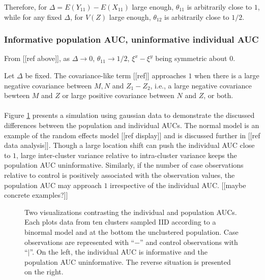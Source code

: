 \message{ !name(manuscript.tex)}\documentclass[12pt]{article}
\DeclareMathOperator{\AUC}{AUC}
\DeclareMathOperator{\V}{Var}
\newcommand{\E}{E}
\newcommand{\cind}{\perp \!\!\! \perp}
\newcommand{\aucindiv}{\theta_{11}}%
\newcommand{\aucpop}{\theta_{12}}%
\renewcommand{\V}{V}
\begin{document}
Therefore, for $\Delta=\E(Y_{11})-\E(X_{11})$ large enough, $\aucindiv$ is arbitrarily close to $1$, while for any fixed $\Delta$, for $\V(Z)$ large enough, $\aucpop$ is arbitrarily close to $1/2$.

\subsubsection{Informative population AUC, uninformative individual AUC}

From [[ref above]], as $\Delta\to 0$, $\aucindiv\to 1/2$,
$\xi^x-\xi^y$ being symmetric about $0$.

Let $\Delta$ be fixed. The covariance-like term [[ref]] approaches $1$ when
there is a large negative covariance between $M,N$ and $Z_1-Z_2$,
i.e., a large negative covariance bewteen $M$ and $Z$ or large
positive covariance between $N$ and $Z$, or both.
\\\\
Figure \ref{fig:comparison} presents a simulation using gaussian data to
demonstrate the discussed differences between the population and
individual AUCs. The normal model is an example of the random effects
model [[ref display]] and is discussed further in [[ref data
analysis]]. Though a large location shift can push the individual
AUC close to $1$, large inter-cluster variance relative to
intra-cluster variance keeps the population AUC
uninformative. Similarly, if the number of case observations relative
to control is positively associated with the observation values, the
population AUC may approach $1$ irrespective of the individual AUC.
[[maybe concrete examples?]]


\begin{figure}[!tbp]
  \centering
  \hfill
  \caption{Two visualizations contrasting the individual and
    population AUCs. Each plots data from ten clusters sampled IID
    according to a binormal model and at the bottom the unclustered
    population. Case observations are represented with ``$-$'' and
    control observations with ``$|$''. On the left, the individual AUC is
    informative and the population AUC uninformative. The reverse situation is
    presented on the right.}  \label{fig:comparison}
\end{figure}
\end{document}
